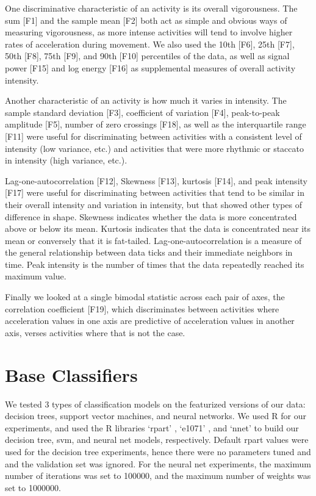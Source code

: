 
One discriminative characteristic of an activity is its overall vigorousness.
The sum [F1] and the sample mean [F2] both act as simple and obvious ways
of measuring vigorousness, as more intense activities will tend to involve
higher rates of acceleration during movement. We also used the 10th [F6], 25th [F7],
50th [F8], 75th [F9], and 90th [F10] percentiles of the data, as well as signal
power [F15] and log energy [F16] as supplemental measures of overall activity intensity.

Another characteristic of an activity is how much it varies in intensity. The sample standard
deviation [F3], coefficient of variation [F4], peak-to-peak amplitude [F5],
number of zero crossings [F18], as well as the
interquartile range [F11] were useful for discriminating between activities
with a consistent level of intensity (low variance, etc.) and activities that were more
rhythmic or staccato in intensity (high variance, etc.). 

Lag-one-autocorrelation [F12], Skewness [F13], kurtosis [F14], and peak intensity [F17]
were useful for discriminating between
activities that tend to be similar in their overall intensity and variation in intensity,
but that showed other types of difference in shape. Skewness indicates whether the data is
more concentrated above or below its mean. Kurtosis indicates that the data is concentrated
near its mean or conversely that it is fat-tailed. Lag-one-autocorrelation is a measure of
the general relationship between data ticks and their immediate neighbors in time. Peak
intensity is the number of times that the data repeatedly reached its maximum value. 

Finally we looked at a single bimodal statistic across each pair of axes, the correlation
coefficient [F19], which discriminates between activities where acceleration values in one axis
are predictive of acceleration values in another axis, verses activities where that is not the case.

\section{Base Classifiers}

We tested 3 types of classification models on the featurized versions of our data:
decision trees, support vector machines, and neural networks. We used R for our
experiments, and used the R libraries `rpart' \cite{rpart}, `e1071' \cite{svm},
and `nnet' \cite{nnet} to build
our decision tree, svm, and neural net models, respectively. Default rpart values
were used for the decision tree experiments, hence there were no parameters tuned and
and the validation set was ignored. For the neural net experiments, 
the maximum number of iterations was set to 100000, and the maximum number of
weights was set to 1000000.

